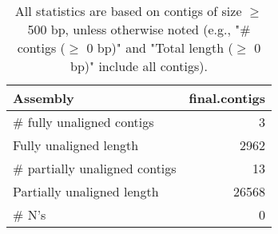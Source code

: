 \documentclass[12pt,a4paper]{article}
\begin{document}
\begin{table}[ht]
\begin{center}
\caption{All statistics are based on contigs of size $\geq$ 500 bp, unless otherwise noted (e.g., "\# contigs ($\geq$ 0 bp)" and "Total length ($\geq$ 0 bp)" include all contigs).}
\begin{tabular}{|l*{1}{|r}|}
\hline
Assembly & final.contigs \\ \hline
\# fully unaligned contigs & 3 \\ \hline
Fully unaligned length & 2962 \\ \hline
\# partially unaligned contigs & 13 \\ \hline
Partially unaligned length & 26568 \\ \hline
\# N's & 0 \\ \hline
\end{tabular}
\end{center}
\end{table}
\end{document}
